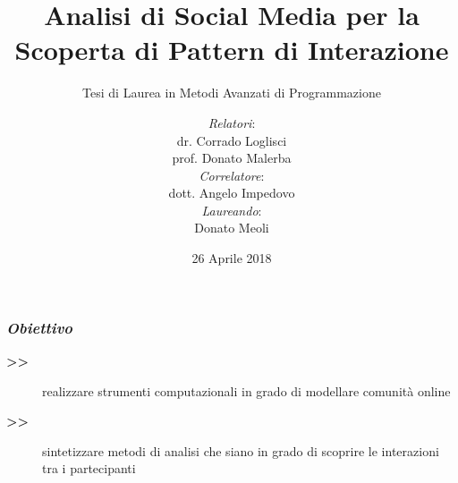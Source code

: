 \documentclass[11pt,xcolor={usenames,dvipsnames,svgnames},compress]{beamer}
\begin{document}
\newlength{\custombulletheight}
\setlength{\custombulletheight}{\dimexpr0.5\ht1-0.5\ht2}

\title{Analisi di Social Media per la \\ Scoperta di Pattern di Interazione}
\author{\textit{Relatori}: \\ dr. Corrado Loglisci \\ prof. Donato Malerba \\ [1.5ex] 
\textit{Correlatore}: \\ dott. Angelo Impedovo 
\begin{flushright}\textit{Laureando}: \\ Donato Meoli \end{flushright}}
\subtitle{Tesi di Laurea in Metodi Avanzati di Programmazione}
\date{26 Aprile 2018}

\footnotesize \let\small\footnotesize

{
  \begin{frame}
    \titlepage
  \end{frame}
}

\begin{frame}
  \frametitle{\textcolor{lacamlilac}{\textbf{\emph{Obiettivo}}}}
  
  \begin{description}
  \item[\textbf{>>}] realizzare strumenti computazionali in grado di modellare comunit{\`a} online
  \item[\textbf{>>}] sintetizzare metodi di analisi che siano in grado di scoprire le interazioni tra i partecipanti
  \end{description}\bigskip
  
\end{frame}
\end{document}
